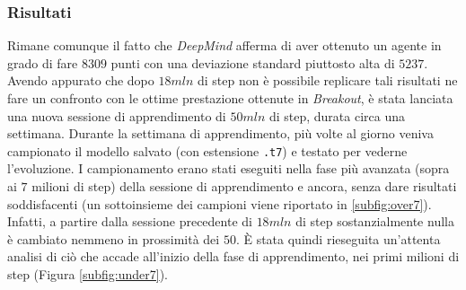 \documentclass[twoside,twocolumn,10pt]{extarticle}
\theoremstyle{definition}
\begin{document}
		\subsubsection{Risultati}
			Rimane comunque il fatto che \textit{DeepMind} afferma di aver ottenuto un agente in grado di fare $8309$ punti con una deviazione standard piuttosto alta di $5237$. Avendo appurato che dopo $18mln$ di step non è possibile replicare tali risultati ne fare un confronto con le ottime prestazione ottenute in \textit{Breakout}, è stata lanciata una nuova sessione di apprendimento di $50mln$ di step, durata circa una settimana. Durante la settimana di apprendimento, più volte al giorno veniva campionato il modello salvato (con estensione \texttt{.t7}) e testato per vederne l'evoluzione. I campionamento erano stati eseguiti nella fase più avanzata (sopra ai $7$ milioni di step) della sessione di apprendimento e ancora, senza dare risultati soddisfacenti (un sottoinsieme dei campioni viene riportato in \ref{subfig:over7}). Infatti, a partire dalla sessione precedente di $18mln$ di step sostanzialmente nulla è cambiato nemmeno in prossimità dei $50$. È stata quindi rieseguita un'attenta analisi di ciò che accade all'inizio della fase di apprendimento, nei primi milioni di step (Figura \ref{subfig:under7}).			
\end{document}
